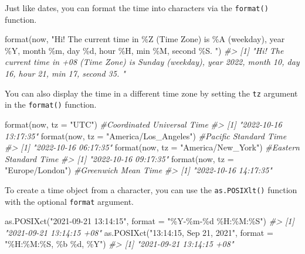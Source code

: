 \documentclass[
]{book}
\newenvironment{Shaded}{\begin{snugshade}}{\end{snugshade}}
\newcommand{\AttributeTok}[1]{\textcolor[rgb]{0.77,0.63,0.00}{#1}}
\newcommand{\CommentTok}[1]{\textcolor[rgb]{0.56,0.35,0.01}{\textit{#1}}}
\newcommand{\FunctionTok}[1]{\textcolor[rgb]{0.00,0.00,0.00}{#1}}
\newcommand{\NormalTok}[1]{#1}
\newcommand{\StringTok}[1]{\textcolor[rgb]{0.31,0.60,0.02}{#1}}
\begin{document}
Just like dates, you can format the time into characters via the \texttt{format()} function.

\begin{Shaded}
\begin{Highlighting}[]
\FunctionTok{format}\NormalTok{(now, }\StringTok{"Hi! The current time in \%Z (Time Zone) is \%A (weekday), year \%Y, month \%m, day \%d, hour \%H, min \%M, second \%S. "}\NormalTok{)}
\CommentTok{\#\textgreater{} [1] "Hi! The current time in +08 (Time Zone) is Sunday (weekday), year 2022, month 10, day 16, hour 21, min 17, second 35. "}
\end{Highlighting}
\end{Shaded}

You can also display the time in a different time zone by setting the \texttt{tz} argument in the \texttt{format()} function.

\begin{Shaded}
\begin{Highlighting}[]
\FunctionTok{format}\NormalTok{(now, }\AttributeTok{tz =} \StringTok{"UTC"}\NormalTok{)                 }\CommentTok{\#Coordinated Universal Time}
\CommentTok{\#\textgreater{} [1] "2022{-}10{-}16 13:17:35"}
\FunctionTok{format}\NormalTok{(now, }\AttributeTok{tz =} \StringTok{"America/Los\_Angeles"}\NormalTok{) }\CommentTok{\#Pacific Standard Time}
\CommentTok{\#\textgreater{} [1] "2022{-}10{-}16 06:17:35"}
\FunctionTok{format}\NormalTok{(now, }\AttributeTok{tz =} \StringTok{"America/New\_York"}\NormalTok{)    }\CommentTok{\#Eastern Standard Time}
\CommentTok{\#\textgreater{} [1] "2022{-}10{-}16 09:17:35"}
\FunctionTok{format}\NormalTok{(now, }\AttributeTok{tz =} \StringTok{"Europe/London"}\NormalTok{)       }\CommentTok{\#Greenwich Mean Time }
\CommentTok{\#\textgreater{} [1] "2022{-}10{-}16 14:17:35"}
\end{Highlighting}
\end{Shaded}

To create a time object from a character, you can use the \texttt{as.POSIXlt()} function with the optional \texttt{format} argument.

\begin{Shaded}
\begin{Highlighting}[]
\FunctionTok{as.POSIXct}\NormalTok{(}\StringTok{"2021{-}09{-}21 13:14:15"}\NormalTok{, }\AttributeTok{format =} \StringTok{"\%Y{-}\%m{-}\%d \%H:\%M:\%S"}\NormalTok{)}
\CommentTok{\#\textgreater{} [1] "2021{-}09{-}21 13:14:15 +08"}
\FunctionTok{as.POSIXct}\NormalTok{(}\StringTok{"13:14:15, Sep 21, 2021"}\NormalTok{, }\AttributeTok{format =} \StringTok{"\%H:\%M:\%S, \%b \%d, \%Y"}\NormalTok{)}
\CommentTok{\#\textgreater{} [1] "2021{-}09{-}21 13:14:15 +08"}
\end{Highlighting}
\end{Shaded}
\end{document}
